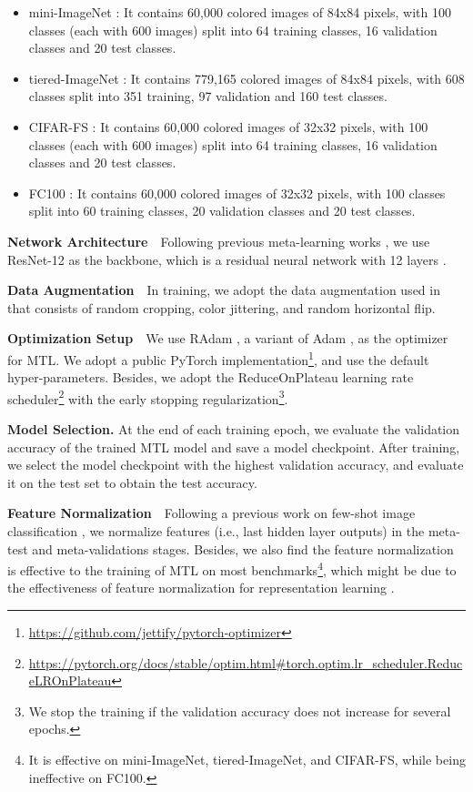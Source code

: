 \documentclass{article}
\begin{document}
\begin{itemize}[leftmargin=*,align=left]
    \item mini-ImageNet \cite{matching-net}: It contains 60,000 colored images of 84x84 pixels, with 100 classes (each with 600 images) split into 64 training classes, 16 validation classes and 20 test classes.
    \item tiered-ImageNet \cite{ren2018metalearning}: It contains 779,165 colored images of 84x84 pixels, with 608 classes split into 351 training, 97 validation and 160 test classes.
    \item CIFAR-FS \cite{r2d2}: It contains 60,000 colored images of 32x32 pixels, with 100 classes (each with 600 images) split into 64 training classes, 16 validation classes and 20 test classes.
    \item FC100 \cite{NEURIPS2018_66808e32}: It contains 60,000 colored images of 32x32 pixels, with 100 classes split into 60 training classes, 20 validation classes and 20 test classes.
\end{itemize}

\textbf{Network Architecture}~~Following previous meta-learning works \cite{metaOptNet,NEURIPS2018_66808e32,tian2020rethink}, we use ResNet-12 as the backbone, which is a residual neural network with 12 layers \cite{resnet}. 

\textbf{Data Augmentation}~~In training, we adopt the data augmentation used in \citet{metaOptNet} that consists of random cropping, color jittering, and random horizontal flip.

\textbf{Optimization Setup}~~We use RAdam \cite{liu2019radam}, a variant of Adam \cite{adam}, as the optimizer for MTL. We adopt a public PyTorch implementation\footnote{ \url{https://github.com/jettify/pytorch-optimizer}}, and use the default hyper-parameters. Besides, we adopt the ReduceOnPlateau learning rate scheduler\footnote{ \url{https://pytorch.org/docs/stable/optim.html\#torch.optim.lr_scheduler.ReduceLROnPlateau}} with the early stopping regularization\footnote{We stop the training if the validation accuracy does not increase for several epochs.}.

\textbf{Model Selection.} At the end of each training epoch, we evaluate the validation accuracy of the trained MTL model and save a model checkpoint. After training, we select the model checkpoint with the highest validation accuracy, and evaluate it on the test set to obtain the test accuracy.

\textbf{Feature Normalization}~~Following a previous work on few-shot image classification \cite{tian2020rethink}, we normalize features (i.e., last hidden layer outputs) in the meta-test and meta-validations stages. Besides, we also find the feature normalization is effective to the training of MTL on most benchmarks\footnote{It is effective on mini-ImageNet, tiered-ImageNet, and CIFAR-FS, while being ineffective on FC100.}, which might be due to the effectiveness of feature normalization for representation learning \citep{wang2020understand}.
\end{document}
